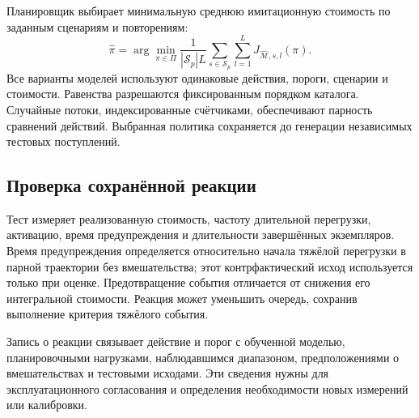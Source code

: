 Планировщик выбирает минимальную среднюю имитационную стоимость по заданным сценариям и повторениям:
\begin{equation}\label{eq:policy}
\widehat\pi=\arg\min_{\pi\in\Pi}\frac{1}{|\mathcal S_p|L}
\sum_{s\in\mathcal S_p}\sum_{l=1}^{L}J_{\widehat{\mathcal M},s,l}(\pi).
\end{equation}
Все варианты моделей используют одинаковые действия, пороги, сценарии и стоимости. Равенства разрешаются фиксированным порядком каталога. Случайные потоки, индексированные счётчиками, обеспечивают парность сравнений действий. Выбранная политика сохраняется до генерации независимых тестовых поступлений.

\subsection{Проверка сохранённой реакции}
Тест измеряет реализованную стоимость, частоту длительной перегрузки, активацию, время предупреждения и длительности завершённых экземпляров. Время предупреждения определяется относительно начала тяжёлой перегрузки в парной траектории без вмешательства; этот контрфактический исход используется только при оценке. Предотвращение события отличается от снижения его интегральной стоимости. Реакция может уменьшить очередь, сохранив выполнение критерия тяжёлого события.

Запись о реакции связывает действие и порог с обученной моделью, планировочными нагрузками, наблюдавшимся диапазоном, предположениями о вмешательствах и тестовыми исходами. Эти сведения нужны для эксплуатационного согласования и определения необходимости новых измерений или калибровки.
